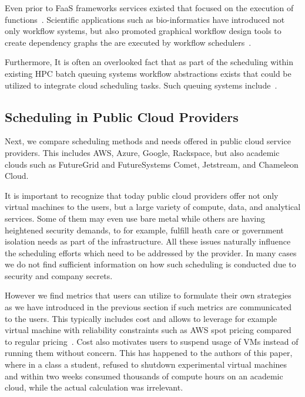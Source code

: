 \documentclass[final,5p,times,twocolumn]{elsarticle}
\begin{document}
Even prior to FaaS frameworks services existed that focused on the
execution of functions~\cite{las-infogram}.  Scientific applications
such as bio-informatics have introduced not only workflow systems, but
also promoted graphical workflow design tools to create dependency
graphs the are executed by workflow
schedulers~\cite{oinn2004taverna,tan2010comparison,yu2005taxonomy}.
  
Furthermore, It is often an overlooked fact that as part of the
scheduling within existing HPC batch queuing systems workflow
abstractions exists that could be utilized to integrate cloud
scheduling tasks. Such queuing systems
include~\cite{www-lsf,www-moab,www-univa-GE-manual,www-pbs-manual}.



\subsection{Scheduling in Public Cloud Providers}
\label{sec:public}

Next, we compare scheduling methods and needs offered in public cloud
service providers. This includes AWS, Azure, Google,
Rackspace, but also academic clouds such as FutureGrid and
FutureSystems Comet, Jetstream, and Chameleon Cloud.

It is important to recognize that today public cloud providers offer
not only virtual machines to the users, but a large variety of
compute, data, and analytical services. Some of them may even use bare
metal while others are having heightened security demands, to for
example, fulfill heath care or government isolation needs as part of
the infrastructure. All these issues naturally influence the
scheduling efforts which need to be addressed by the provider. In many
cases we do not find sufficient information on how such scheduling is
conducted due to security and company secrets.

However we find metrics that users can utilize to formulate their own
strategies as we have introduced in the previous section if such
metrics are communicated to the users. This typically includes cost
and allows to leverage for example virtual machine with reliability
constraints such as AWS spot pricing compared to regular
pricing~\cite{AmazonEC22015}.  Cost also motivates users to suspend
usage of VMs instead of running them without concern. This has
happened to the authors of this paper, where in a class a student,
refused to shutdown experimental virtual machines and within two weeks
consumed thousands of compute hours on an academic cloud, while the
actual calculation was irrelevant.
\end{document}
